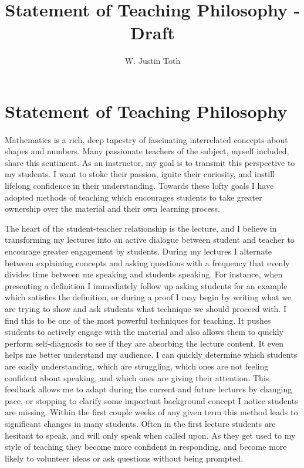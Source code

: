 \documentclass{article}
\title{Statement of Teaching Philosophy - Draft}
\author{W. Justin Toth}
\begin{document}
\maketitle
\tableofcontents
\newpage
\section{Statement of Teaching Philosophy}
\paragraph{}
Mathematics is a rich, deep tapestry of fascinating interrelated concepts about shapes and numbers. Many passionate teachers of the subject, myself included, share this sentiment. As an instructor, my goal is to transmit this perspective to my students. I want to stoke their passion, ignite their curiosity, and instill lifelong confidence in their understanding. Towards these lofty goals I have adopted methods of teaching which encourages students to take greater ownership over the material and their own learning process.

The heart of the student-teacher relationship is the lecture, and I believe in transforming my lectures into an active dialogue between student and teacher to encourage greater engagement by students. During my lectures I alternate between explaining concepts and asking questions with a frequency that evenly divides time between me speaking and students speaking. For instance, when presenting a definition I immediately follow up asking students for an example which satisfies the definition, or during a proof I may begin by writing what we are trying to show and ask students what technique we should proceed with. I find this to be one of the most powerful techniques for teaching. It pushes students to actively engage with the material and also allows them to quickly perform self-diagnosis to see if they are absorbing the lecture content. It even helps me better understand my audience. I can quickly determine which students are easily understanding, which are struggling, which ones are not feeling confident about speaking, and which ones are giving their attention. This feedback allows me to adapt during the current and future lectures by changing pace, or stopping to clarify some important background concept I notice students are missing. Within the first couple weeks of any given term this method leads to significant changes in many students. Often in the first lecture students are hesitant to speak, and will only speak when called upon. As they get used to my style of teaching they become more confident in responding, and become more likely to volunteer ideas or ask questions without being prompted.
\end{document}
